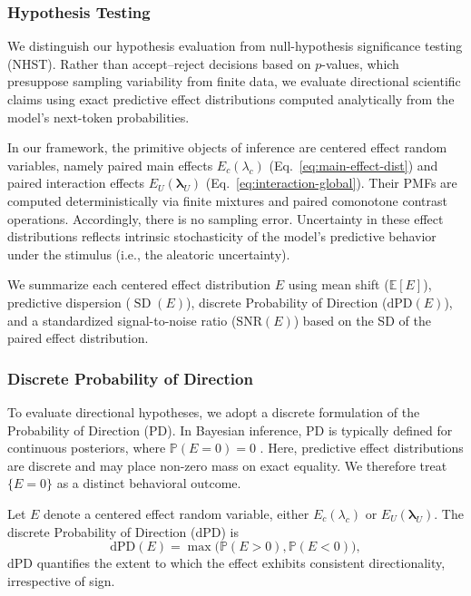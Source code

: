 \subsubsection{Hypothesis Testing}
\label{sec:hypothesis-testing}

We distinguish our hypothesis evaluation from null-hypothesis significance
testing (NHST). Rather than accept--reject decisions based on $p$-values, which
presuppose sampling variability from finite data, we evaluate directional
scientific claims using exact predictive effect distributions computed
analytically from the model's next-token probabilities.

In our framework, the primitive objects of inference are centered effect random
variables, namely paired main effects $E_c(\lambda_c)$
(Eq.~\eqref{eq:main-effect-dist}) and paired interaction effects
$E_U(\boldsymbol{\lambda}_U)$ (Eq.~\eqref{eq:interaction-global}). Their PMFs are
computed deterministically via finite mixtures and paired comonotone contrast
operations.
Accordingly, there is no sampling error. Uncertainty in these effect
distributions reflects intrinsic stochasticity of the model's predictive
behavior under the stimulus (i.e., the aleatoric uncertainty).

We summarize each centered effect distribution $E$ using
mean shift ($\mathbb{E}[E]$),
predictive dispersion ($\operatorname{SD}(E)$),
discrete Probability of Direction ($\mathrm{dPD}(E)$),
and a standardized signal-to-noise ratio ($\mathrm{SNR}(E)$) based on the SD
of the paired effect distribution.

\subsubsection{Discrete Probability of Direction}
\label{app:dpd}

To evaluate directional hypotheses, we adopt a discrete formulation of the
Probability of Direction (PD). In Bayesian inference, PD is typically defined
for continuous posteriors, where $\mathbb{P}(E=0)=0$ \citep{Makowski2019}. Here,
predictive effect distributions are discrete and may place non-zero mass on
exact equality. We therefore treat $\{E=0\}$ as a distinct behavioral outcome.

Let $E$ denote a centered effect random variable, either $E_c(\lambda_c)$ or
$E_U(\boldsymbol{\lambda}_U)$. The discrete Probability of Direction (dPD) is
\begin{equation}
\label{eq:dpd}
\mathrm{dPD}(E)
=
\max\!\bigl(
\mathbb{P}(E > 0),
\mathbb{P}(E < 0)
\bigr),
\end{equation}
dPD quantifies the extent to which the effect exhibits consistent
directionality, irrespective of sign.

